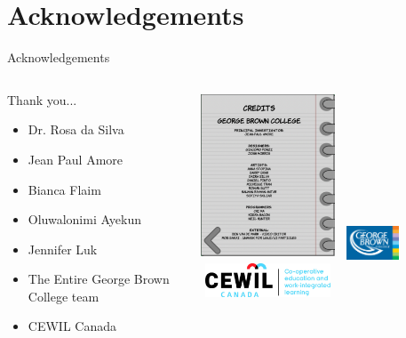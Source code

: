 \documentclass{beamer}
\begin{document}
	\section{Acknowledgements}
	\begin{frame}{Acknowledgements}
		\begin{columns}
			\begin{column}{0.45\textwidth}
				Thank you...
				\begin{itemize}
					\item Dr. Rosa da Silva
					\item Jean Paul Amore
					\item Bianca Flaim
					\item Oluwalonimi Ayekun
					\item Jennifer Luk
					\item The Entire George Brown College team
					\item CEWIL Canada	
				\end{itemize}
			\end{column}
			\begin{column}{0.5\textwidth}
				\centering
				\includegraphics[width=4cm, height=5cm]{credits.png}
				\includegraphics[width=2cm, height=1cm]{gbc.png}	
				\includegraphics[width=4cm, height=1cm]{cewil.jpg}
			\end{column}
		\end{columns}		
		
	
	\end{frame}
\end{document}
